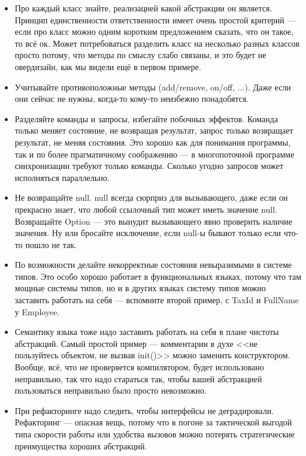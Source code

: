 \documentclass{../../text-style}
\begin{document}
\begin{itemize}
    \item Про каждый класс знайте, реализацией какой абстракции он является. Принцип единственности ответственности имеет очень простой критерий --- если про класс можно одним коротким предложением сказать, что он такое, то всё ок. Может потребоваться разделить класс на несколько разных классов просто потому, что методы по смыслу слабо связаны, и это будет не овердизайн, как мы видели ещё в первом примере.
    \item Учитывайте противоположные методы (add/remove, on/off, ...). Даже если они сейчас не нужны, когда-то кому-то неизбежно понадобятся.
    \item Разделяйте команды и запросы, избегайте побочных эффектов. Команда только меняет состояние, не возвращая результат, запрос только возвращает результат, не меняя состояния. Это хорошо как для понимания программы, так и по более прагматичному соображению --- в многопоточной программе синхронизации требуют только команды. Сколько угодно запросов может исполняться параллельно.
    \item Не возвращайте null. null всегда сюрприз для вызывающего, даже если он прекрасно знает, что любой ссылочный тип может иметь значение null. Возвращайте Option --- это вынудит вызывающего явно проверить наличие значения. Ну или бросайте исключение, если null-ы бывают только если что-то пошло не так.
    \item По возможности делайте некорректные состояния невыразимыми в системе типов. Это особо хорошо работает в функциональных языках, потому что там мощные системы типов, но и в других языках систему типов можно заставить работать на себя --- вспомните второй пример, с TaxId и FullName у Employee.
    \item Семантику языка тоже надо заставить работать на себя в плане чистоты абстракций. Самый простой пример --- комментарии в духе <<не пользуйтесь объектом, не вызвав  init()>> можно заменить конструктором. Вообще, всё, что не проверяется компилятором, будет использовано неправильно, так что надо стараться так, чтобы вашей абстракцией пользоваться неправильно было просто невозможно.
    \item При рефакторинге надо следить, чтобы интерфейсы не деградировали. Рефакторинг --- опасная вещь, потому что в погоне за тактической выгодой типа скорости работы или удобства вызовов можно потерять стратегические преимущества хороших абстракций.
\end{itemize}
\end{document}
